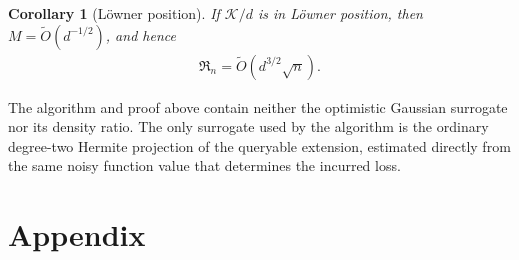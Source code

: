 \documentclass{article}
\theoremstyle{plain}
\newtheorem{corollary}[theorem]{Corollary}
\theoremstyle{definition}
\theoremstyle{plain}
\newcommand{\Reg}{\mathfrak{R}}
\newcommand{\cK}{\mathcal K}
\begin{document}
\begin{corollary}[L\"owner position]
    If $\cK/d$ is in L\"owner position, then
    $M=\widetilde O(d^{-1/2})$, and hence
    \begin{align}
        \Reg_n=\widetilde O(d^{3/2}\sqrt n).
    \end{align}
\end{corollary}

The algorithm and proof above contain neither the optimistic Gaussian
surrogate nor its density ratio.  The only surrogate used by the
algorithm is the ordinary degree-two Hermite projection of the
queryable extension, estimated directly from the same noisy function
value that determines the incurred loss.








\newpage
\clearpage


\clearpage

\appendix
\section{Appendix}
\label{sec:appendix}
\end{document}
